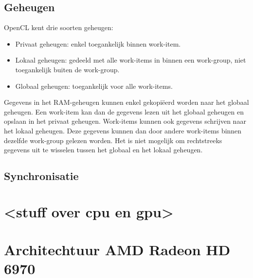 \subsection{Geheugen}
\label{h:opencl:geheugen}
OpenCL kent drie soorten geheugen:
\begin{itemize}
    \item Privaat geheugen: enkel toegankelijk binnen work-item.
    \item Lokaal geheugen: gedeeld met alle work-items in binnen een work-group, niet toegankelijk buiten de work-group.
    \item Globaal geheugen: toegankelijk voor alle work-items.
\end{itemize}

Gegevens in het RAM-geheugen kunnen enkel gekopi\"eerd worden naar het globaal geheugen. Een work-item kan dan de gegevens lezen uit het globaal geheugen en opslaan in het privaat geheugen. Work-items kunnen ook gegevens schrijven naar het lokaal geheugen. Deze gegevens kunnen dan door andere work-items binnen dezelfde work-group gelezen worden. Het is niet mogelijk om rechtstreeks gegevens uit te wisselen tussen het globaal en het lokaal geheugen. 

\subsection{Synchronisatie}

\section{<stuff over cpu en gpu>}


\section{Architechtuur AMD Radeon HD 6970}